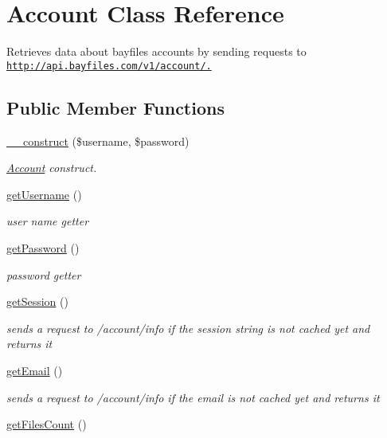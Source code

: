 \hypertarget{classAccount}{
\section{Account Class Reference}
\label{classAccount}
}


Retrieves data about bayfiles accounts by sending requests to \href{http://api.bayfiles.com/v1/account/.}{\tt http://api.bayfiles.com/v1/account/.}  


\subsection*{Public Member Functions}
\begin{DoxyCompactItemize}
\item 
\hyperlink{classAccount_ada0eeeed16967d6e548488030b5bdaef}{\_\-\_\-construct} (\$username, \$password)
\begin{DoxyCompactList}\small\item\em \hyperlink{classAccount}{Account} construct. \end{DoxyCompactList}\item 
\hyperlink{classAccount_aadd43a144ad6802e0fa8967e437fd8bb}{getUsername} ()
\begin{DoxyCompactList}\small\item\em user name getter \end{DoxyCompactList}\item 
\hyperlink{classAccount_ad94891116350680172a3c2529d7f0570}{getPassword} ()
\begin{DoxyCompactList}\small\item\em password getter \end{DoxyCompactList}\item 
\hyperlink{classAccount_a3b37b3393454a1352929b4010ac8e9c3}{getSession} ()
\begin{DoxyCompactList}\small\item\em sends a request to /account/info if the session string is not cached yet and returns it \end{DoxyCompactList}\item 
\hyperlink{classAccount_ace3c3419f3683e4a0a0dba26bd91a194}{getEmail} ()
\begin{DoxyCompactList}\small\item\em sends a request to /account/info if the email is not cached yet and returns it \end{DoxyCompactList}\item 
\hypertarget{classAccount_a07d537af3b7de4caffa58c1a67763966}{
\hyperlink{classAccount_a07d537af3b7de4caffa58c1a67763966}{getFilesCount} ()}
\label{classAccount_a07d537af3b7de4caffa58c1a67763966}


\end{DoxyCompactItemize}
